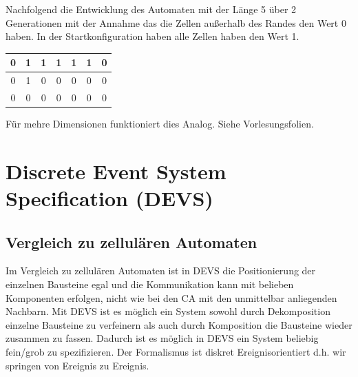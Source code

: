 \documentclass[11pt, fleqn, a4paper, leqno]{scrartcl} %
\begin{document}
		Nachfolgend die Entwicklung des Automaten mit der Länge 5 über 2 Generationen mit der Annahme das die Zellen außerhalb des Randes den Wert 0 haben. In der Startkonfiguration haben alle Zellen haben den Wert 1.
		\begin{center}
			\begin{tabular}{|c||c|c|c|c|c||c|}
			\hline 0 & 1 & 1 & 1 & 1 & 1 & 0 \\ 
			\hline 0 & 1 & 0 &  0& 0 & 0 & 0 \\ 
			\hline 0 & 0 & 0 & 0 & 0 & 0 & 0 \\ 
			\hline 
			\end{tabular} 
		\end{center}
		Für mehre Dimensionen funktioniert dies Analog. Siehe Vorlesungsfolien.
		\newpage
\section{Discrete Event System Specification (DEVS)}
	\subsection{Vergleich zu zellulären Automaten}
		Im Vergleich zu zellulären Automaten ist in DEVS die Positionierung der einzelnen Bausteine egal und die Kommunikation kann mit belieben Komponenten erfolgen, nicht wie bei den CA mit den unmittelbar anliegenden Nachbarn. Mit DEVS ist es möglich ein System sowohl durch Dekomposition einzelne Bausteine zu verfeinern als auch durch Komposition die Bausteine wieder zusammen zu fassen. Dadurch ist es möglich in DEVS ein System beliebig fein/grob zu spezifizieren. Der Formalismus ist diskret Ereignisorientiert d.h. wir springen von Ereignis zu Ereignis.
\end{document}
